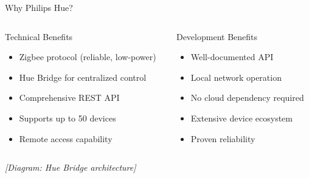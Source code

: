 \documentclass{beamer}
\begin{document}
\begin{frame}{Why Philips Hue?}
\begin{columns}
\begin{column}{0.5\textwidth}
\begin{block}{Technical Benefits}
\begin{itemize}
    \item Zigbee protocol (reliable, low-power)
    \item Hue Bridge for centralized control
    \item Comprehensive REST API
    \item Supports up to 50 devices
    \item Remote access capability
\end{itemize}
\end{block}
\end{column}
\begin{column}{0.5\textwidth}
\begin{block}{Development Benefits}
\begin{itemize}
    \item Well-documented API
    \item Local network operation
    \item No cloud dependency required
    \item Extensive device ecosystem
    \item Proven reliability
\end{itemize}
\end{block}
\end{column}
\end{columns}

\begin{center}
\textit{[Diagram: Hue Bridge architecture]}
\end{center}
\end{frame}
\end{document}
